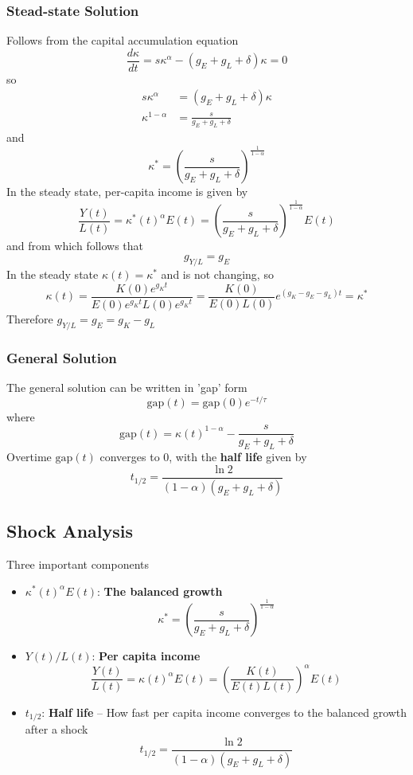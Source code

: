 \documentclass[a4paper]{article}
\begin{document}
\subsubsection*{Stead-state Solution}
Follows from the capital accumulation equation
\[ \frac{d\kappa}{dt} = s\kappa^\alpha - (g_E + g_L + \delta)\kappa = 0 \]
so \begin{align*}
    s\kappa^\alpha &= (g_E + g_L + \delta)\kappa \\
    \kappa^{1-\alpha} &= \frac{s}{g_E + g_L + \delta}
\end{align*}
and
\begin{equation*}
    \boxed{\kappa^* = (\frac{s}{g_E + g_L + \delta})^\frac{1}{1 - \alpha}}
\end{equation*}
In the steady state, per-capita income is given by
\[ \frac{Y(t)}{L(t)}  = \kappa^*(t)^\alpha E(t) = (\frac{s}{g_E + g_L + \delta})^\frac{1}{1 - \alpha}E(t) \]
and from which follows that
\[ g_{Y/L} = g_E \]
In the steady state $\kappa(t) = \kappa^*$ and is not changing, so
\[ \kappa(t) = \frac{K(0)e^{g_Kt}}{E(0)e^{g_Kt}L(0)e^{g_Kt}} 
= \frac{K(0)}{E(0)L(0)}e^{(g_K-g_E-g_L)t} = \kappa^* \]
Therefore $g_{Y/L} = g_E = g_K - g_L$

\subsubsection*{General Solution}
The general solution can be written in 'gap' form
\[ \text{gap}(t) = \text{gap}(0)e^{-t/\tau} \]
where
\[ \text{gap}(t) = \kappa(t)^{1-\alpha} - \frac{s}{g_E + g_L + \delta} \]
Overtime $\text{gap}(t)$ converges to 0, with the \textbf{half life} given by
\[ \boxed{t_{1/2} = \frac{\ln 2}{(1 - \alpha)(g_E + g_L + \delta)}} \]

\subsection{Shock Analysis}
Three important components\begin{itemize}
    \item $\kappa^*(t)^\alpha E(t)$: \textbf{The balanced growth} 
    \[\kappa^* = (\frac{s}{g_E + g_L + \delta})^\frac{1}{1 - \alpha}\]
    \item $Y(t)/L(t)$: \textbf{Per capita income}
    \[ \frac{Y(t)}{L(t)} = \kappa(t)^\alpha E(t) = (\frac{K(t)}{E(t)L(t)})^\alpha E(t) \]
    \item $t_{1/2}$: \textbf{Half life} -- How fast per capita income converges to the 
    balanced growth after a shock
    \[ t_{1/2} = \frac{\ln 2}{(1 - \alpha)(g_E + g_L + \delta)} \]
\end{itemize}
\end{document}
